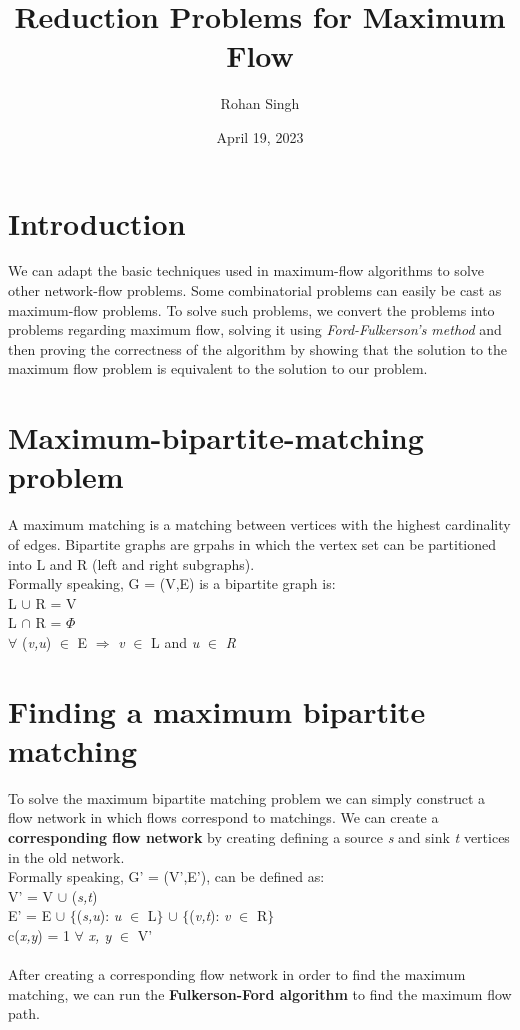 \documentclass[12pt, letterpaper]{article}
\title{Reduction Problems for Maximum Flow}
\author{Rohan Singh}
\date{April 19, 2023}
\begin{document}
\maketitle

\section{Introduction}
We can adapt the basic techniques used in maximum-flow algorithms to solve other network-flow problems. Some combinatorial problems can easily be cast as maximum-flow problems. To solve such problems, we convert the problems into problems regarding maximum flow, solving it using \textit{Ford-Fulkerson's method} and then proving the correctness of the algorithm by showing that the solution to the maximum flow problem is equivalent to the solution to our problem.

\section{Maximum-bipartite-matching problem}
A maximum matching is a matching between vertices with the highest cardinality of edges. Bipartite graphs are grpahs in which the vertex set can be partitioned into L and R (left and right subgraphs).\\ Formally speaking, G = (V,E) is a bipartite graph is:\\
 L $\cup$ R = V\\ L $\cap$ R = $\Phi$\\ $\forall$ (\textit{v,u}) $\in$ E $\Rightarrow$ \textit{v} $\in$ L and \textit{u} $\in$ \textit{R}

\section{Finding a maximum bipartite matching}
To solve the maximum bipartite matching problem we can simply construct a flow network in which flows correspond to matchings. We can create a \textbf{corresponding flow network} by creating defining a source \textit{s} and sink \textit{t} vertices in the old network.\\Formally speaking, G' = (V',E'), can be defined as:\\
V' = V $\cup$ (\textit{s,t})\\
E' = E $\cup$ $\{$(\textit{s,u}): \textit{u} $\in$ L$\}$ $\cup$ $\{$(\textit{v,t}): \textit{v} $\in$ R$\}$\\
c(\textit{x,y}) = 1 $\forall$ \textit{x, y} $\in$ V'\\\\
After creating a corresponding flow network in order to find the maximum matching, we can run the \textbf{Fulkerson-Ford algorithm} to find the maximum flow path.
\end{document}
